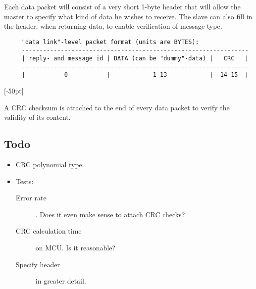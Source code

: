 Each data packet will consist of a very short 1-byte header that will allow the master to specify what kind of data he wishes to receive. The slave can also fill in the header, when returning data, to enable verification of message type.

\begin{verbatim}
     "data link"-level packet format (units are BYTES):
     ----------------------------------------------------------------
     | reply- and message id | DATA (can be "dummy"-data) |   CRC   |
     ----------------------------------------------------------------
     |           0           |            1-13            |  14-15  |
\end{verbatim}
[-50pt]

A CRC checksum is attached to the end of every data packet to verify the validity of its content.

\subsection{Todo}
\begin{itemize}
  \item CRC polynomial type.
  \item Tests:
  \begin{description}
    \item [Error rate]. Does it even make sense to attach CRC checks?
    \item [CRC calculation time] on MCU. Is it reasonable?
    \item [Specify header] in greater detail.
  \end{description}
\end{itemize}

